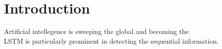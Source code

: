 \section{Introduction}
Artificial intellegence is sweeping the global and becoming the 
\\
LSTM is particularly prominent in detecting the sequential information. 